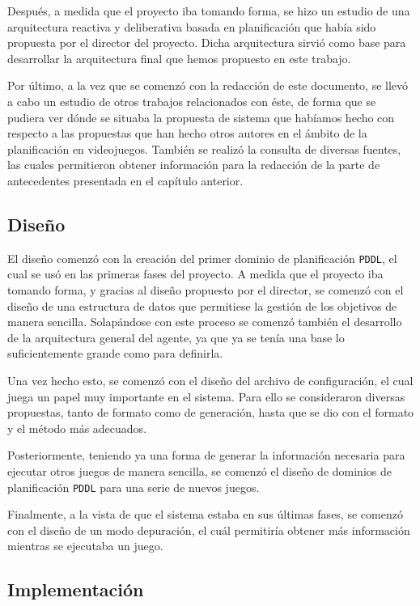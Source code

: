 Después, a medida que el proyecto iba tomando forma, se hizo un estudio de una arquitectura reactiva
y deliberativa basada en planificación que había sido propuesta por el director del proyecto. Dicha
arquitectura sirvió como base para desarrollar la arquitectura final que hemos propuesto en este trabajo.

Por último, a la vez que se comenzó con la redacción de este documento, se llevó a cabo un estudio
de otros trabajos relacionados con éste, de forma que se pudiera ver dónde se situaba la propuesta
de sistema que habíamos hecho con respecto a las propuestas que han hecho otros autores en el ámbito
de la planificación en videojuegos. También se realizó la consulta de diversas fuentes, las cuales
permitieron obtener información para la redacción de la parte de antecedentes presentada en el capítulo
anterior.

\subsection{Diseño}

El diseño comenzó con la creación del primer dominio de planificación \texttt{PDDL}, el cual
se usó en las primeras fases del proyecto. A medida que el proyecto iba tomando forma, y gracias
al diseño propuesto por el director, se comenzó con el diseño de una estructura de datos que permitiese
la gestión de los objetivos de manera sencilla. Solapándose con este proceso se comenzó también
el desarrollo de la arquitectura general del agente, ya que ya se tenía una base lo suficientemente
grande como para definirla.

Una vez hecho esto, se comenzó con el diseño del archivo de configuración, el cual juega un papel
muy importante en el sistema. Para ello se consideraron diversas propuestas, tanto de formato
como de generación, hasta que se dio con el formato y el método más adecuados.

Posteriormente, teniendo ya una forma de generar la información necesaria para ejecutar otros juegos
de manera sencilla, se comenzó el diseño de dominios de planificación \texttt{PDDL} para una serie
de nuevos juegos.

Finalmente, a la vista de que el sistema estaba en sus últimas fases, se comenzó con el diseño de
un modo depuración, el cuál permitiría obtener más información mientras se ejecutaba un juego.

\subsection{Implementación}

